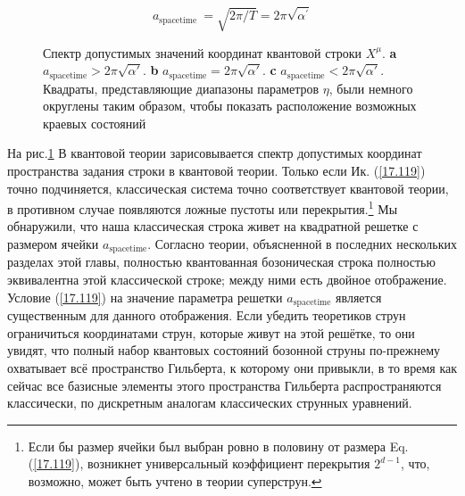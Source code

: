 \documentclass[main.tex]{subfiles}
\begin{document}
\begin{equation}\label{17.119}
a_{\text {spacetime }}=\sqrt{2 \pi / T}=2 \pi \sqrt{\alpha^{\prime}}
\end{equation}

\begin{figure}[ht] %
	\begin{center}
		\caption{
		\label{i17.1} Спектр допустимых значений координат квантовой строки $X^\mu$. \textbf{a} $a_{\text{spacetime}}>2\pi\sqrt{\alpha\prime}$. \textbf{b} $a_{\text{spacetime}}=2\pi\sqrt{\alpha\prime}$. \textbf{c} $a_{\text{spacetime}}<2\pi\sqrt{\alpha\prime}$. Квадраты, представляющие диапазоны параметров $\eta$, были немного округлены таким образом, чтобы показать расположение возможных краевых состояний}
	\end {center}
\end {figure}

На рис.\ref{i17.1} В квантовой теории зарисовывается спектр допустимых координат пространства задания строки в квантовой теории. Только если Ик. (\ref{17.119}) точно подчиняется, классическая система точно соответствует квантовой теории, в противном случае появляются ложные пустоты или перекрытия.\footnote{Если бы размер ячейки был выбран ровно в половину от размера Eq. (\ref{17.119}), возникнет универсальный коэффициент перекрытия $2^{d-1}$, что, возможно, может быть учтено в теории суперструн.} Мы обнаружили, что наша классическая строка живет на квадратной решетке с размером ячейки $a_{\text {spacetime}}$. Согласно теории, объясненной в последних нескольких разделах этой главы, полностью квантованная бозоническая строка полностью эквивалентна этой классической строке; между ними есть двойное отображение. Условие (\ref{17.119}) на значение параметра решетки $a_{\text {spacetime}}$ является существенным для данного отображения. Если убедить теоретиков струн ограничиться координатами струн, которые живут на этой решётке, то они увидят, что полный набор квантовых состояний бозонной струны по-прежнему охватывает всё пространство Гильберта, к которому они привыкли, в то время как сейчас все базисные элементы этого пространства Гильберта распространяются классически, по дискретным аналогам классических струнных уравнений.
\end{document}
